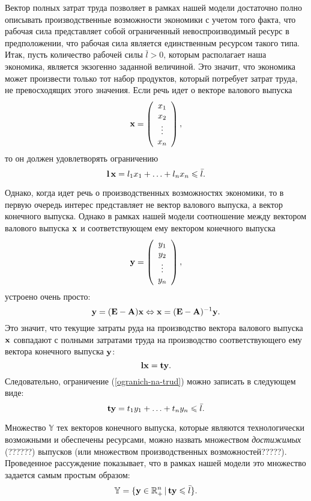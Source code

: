    Вектор полных затрат труда позволяет в рамках нашей модели
    достаточно полно описывать производственные возможности
    экономики с учетом того факта, что рабочая сила представляет
    собой ограниченный невоспроизводимый ресурс в предположении, что
    рабочая сила является единственным   ресурсом такого типа.
    Итак, пусть количество  рабочей силы $\bar{l}>0$, которым располагает наша
    экономика, является  экзогенно заданной величиной. Это значит,
    что экономика может произвести только тот набор продуктов,
    который потребует затрат труда, не превосходящих этого значения.
    Если речь идет о векторе валового выпуска
    \[\mathbf{x}=\left(
     \begin{array}{c}
        x_{1} \\
        x_{2} \\
        \vdots \\
        x_{n}  \\
      \end{array}
    \right),\]
    то он должен удовлетворять ограничению
\begin{equation}
 \label{ogranich-na-trud}
    \mathbf{l}\,\mathbf{x}=l_{1}x_{1}+\ldots+l_{n}x_{n}\leqslant\bar{l}.
    \end{equation}

    Однако, когда идет речь о производственных возможностях
    экономики, то в первую очередь интерес представляет не вектор
    валового выпуска, а вектор конечного выпуска. Однако в рамках
    нашей модели соотношение между вектором валового выпуска
    $\mathbf{x}$ и соответствующем ему вектором конечного выпуска
    \[\mathbf{y}=\left(
     \begin{array}{c}
        y_{1} \\
        y_{2} \\
        \vdots \\
        y_{n}  \\
      \end{array}
    \right),\]
    устроено очень просто:
    \[\mathbf{y}=(\mathbf{E}-\mathbf{A})\mathbf{x} \Leftrightarrow
    \mathbf{x}=(\mathbf{E}-\mathbf{A})^{-1}\mathbf{y}.\]
    Это значит, что текущие затраты руда на производство вектора валового
    выпуска $\mathbf{x}$ совпадают с полными затратами труда на
    производство соответствующего ему вектора конечного выпуска
    $\mathbf{y}$:
    \[\mathbf{l}\mathbf{x}=\mathbf{t}\mathbf{y}.\]
    Следовательно, ограничение (\ref{ogranich-na-trud}) можно записать в
    следующем виде:
    \[\mathbf{t}\mathbf{y}=t_{1}y_{1}+\ldots+t_{n}y_{n}\leqslant\bar{l}.\]

    Множество $\mathbb{Y}$ тех векторов конечного выпуска, которые являются
    технологически возможными и обеспечены ресурсами, можно назвать
    множеством \emph{достижимых} (??????) выпусков
    (или множеством производственных возможностей?????). Проведенное
    рассуждение показывает, что в рамках нашей модели это
    множество задается самым простым образом:
\[
    \mathbb{Y}=\{\mathbf{y}\in\mathbb{R}_{+}^{n} \,|\, \mathbf{t}\mathbf{y}\leqslant\bar{l}\}.
\]


